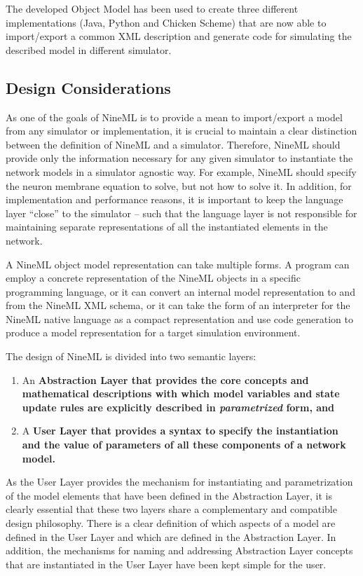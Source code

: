 \documentclass{article}
\begin{document}
The developed Object Model has been used to create three different
implementations (Java, Python and Chicken Scheme) that are now able to
import/export a common XML description and generate code for simulating the
described model in different simulator.

\subsection{Design Considerations}

As one of the goals of NineML is to provide a mean to import/export a model from
any simulator or implementation, it is crucial to maintain a clear distinction
between the definition of NineML and a simulator. Therefore, NineML should
provide only the information necessary for any given simulator
to instantiate the network models in a simulator agnostic way.
For example, NineML should specify the neuron membrane equation to solve,
but not how to solve it.  In addition, for implementation and performance
reasons, it is important to keep the language layer ``close'' to the simulator –
such that the language layer is not responsible for maintaining separate
representations of all the instantiated elements in the network.

A NineML object model representation can take multiple forms.  A
program can employ a concrete representation of the NineML objects in
a specific programming language, or it can convert an internal model
representation to and from the NineML XML schema, or it can take the
form of an interpreter for the NineML native language as a compact
representation and use code generation to produce a model
representation for a target simulation environment.

The design of NineML is divided into two semantic layers:
\begin {enumerate}
\item An \bf{Abstraction Layer} that provides the core concepts and
mathematical descriptions with which model variables and state update
rules are explicitly described in {\em parametrized} form, and
\item A \bf{User Layer} that provides a syntax to specify the
instantiation and the value of parameters of all these components of a network
model.
\end {enumerate}

As the User Layer provides the mechanism for instantiating and
parametrization of the model elements that have been defined in the
Abstraction Layer, it is clearly essential that these two layers share
a complementary and compatible design philosophy. There is a
clear definition of which aspects of a model are defined in the User
Layer and which are defined in the Abstraction Layer. In addition,
the mechanisms for naming and addressing Abstraction Layer concepts
that are instantiated in the User Layer have been kept simple for the
user.
\end{document}
